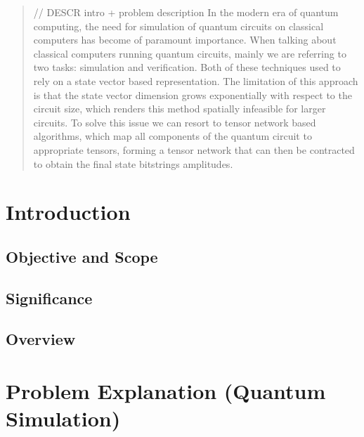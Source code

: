 \documentclass[12pt,oneside,a4paper]{article}
\begin{document}
\begin{abstract}
// DESCR intro + problem description
In the modern era of quantum computing, the need for simulation of quantum circuits on classical computers has become of paramount importance. When talking about classical computers running quantum circuits, mainly we are referring to two tasks: simulation and verification. Both of these techniques used to rely on a state vector based representation. The limitation of this approach is that the state vector dimension grows exponentially with respect to the circuit size, which renders this method spatially infeasible for larger circuits. To solve this issue we can resort to tensor network based algorithms, which map all components of the quantum circuit to appropriate tensors, forming a tensor network that can then be contracted to obtain the final state bitstrings amplitudes.

\end{abstract}

\section{Introduction} 

\subsection{Objective and Scope}

\subsection{Significance}

\subsection{Overview}


\section{Problem Explanation (Quantum Simulation)} 
\end{document}
